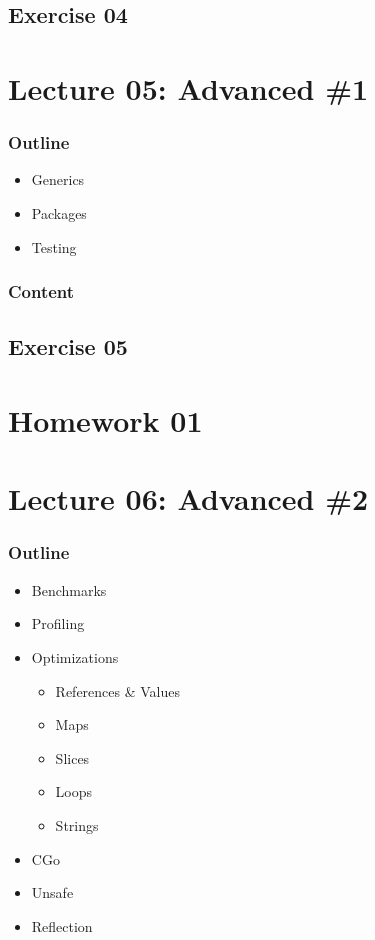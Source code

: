 \documentclass[
  digital,
  color,
  oneside,
  nosansbold,
  nocolorbold,
  lof,
  lot,
]{fithesis4}
\begin{document}
\subsection{Exercise 04}

\section{Lecture 05: Advanced \#1}

\subsubsection{Outline}

\begin{itemize}
    \item Generics
    \item Packages
    \item Testing
\end{itemize}

\subsubsection{Content}

\subsection{Exercise 05}

\section{Homework 01}

\section{Lecture 06: Advanced \#2}

\subsubsection{Outline}

\begin{itemize}
    \item Benchmarks
    \item Profiling
    \item Optimizations
    \begin{itemize}
        \item References \& Values
        \item Maps
        \item Slices
        \item Loops
        \item Strings
    \end{itemize}
    \item CGo
    \item Unsafe
    \item Reflection
\end{itemize}
\end{document}
